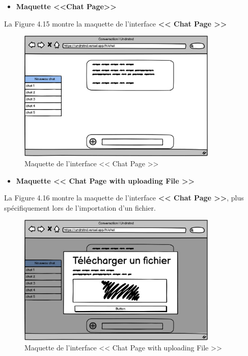 \begin{itemize}
    \item \textbf{Maquette <<Chat Page>>}
\end{itemize}
La Figure 4.15 montre la maquette de l’interface \textbf{<< Chat Page >>}
\begin{figure}[H]
    \centering
    \includegraphics[width=0.85\textwidth,height=0.5\textwidth]{images/chp4/fig15.png}
    \caption{Maquette de l’interface << Chat Page >>}
    \label{fig:Maquette de l’interface <<Chat Page>>}    
\end{figure}
\begin{itemize}
    \item \textbf{Maquette << Chat Page with uploading File >>}
\end{itemize}
La Figure 4.16 montre la maquette de l’interface \textbf{ << Chat Page >>}, plus spécifiquement lors de l’importation d’un fichier.
\begin{figure}[H]
    \centering
    \includegraphics[width=0.85\textwidth,height=0.5\textwidth]{images/chp4/fig16.png}
    \caption{Maquette de l’interface << Chat Page with uploading File >>}
    \label{fig:Maquette de l’interface <<Chat Page with uploading File>>}    
\end{figure}
